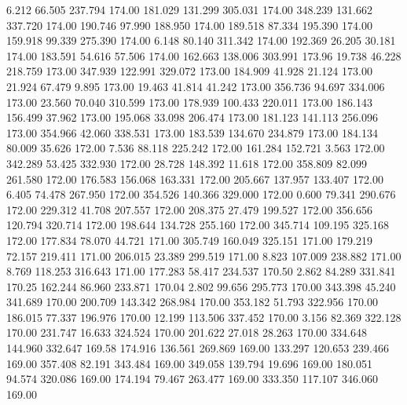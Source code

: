    6.212   66.505  237.794       174.00
 181.029  131.299  305.031       174.00
 348.239  131.662  337.720       174.00
 190.746   97.990  188.950       174.00
 189.518   87.334  195.390       174.00
 159.918   99.339  275.390       174.00
   6.148   80.140  311.342       174.00
 192.369   26.205   30.181       174.00
 183.591   54.616   57.506       174.00
 162.663  138.006  303.991       173.96
  19.738   46.228  218.759       173.00
 347.939  122.991  329.072       173.00
 184.909   41.928   21.124       173.00
  21.924   67.479    9.895       173.00
  19.463   41.814   41.242       173.00
 356.736   94.697  334.006       173.00
  23.560   70.040  310.599       173.00
 178.939  100.433  220.011       173.00
 186.143  156.499   37.962       173.00
 195.068   33.098  206.474       173.00
 181.123  141.113  256.096       173.00
 354.966   42.060  338.531       173.00
 183.539  134.670  234.879       173.00
 184.134   80.009   35.626       172.00
   7.536   88.118  225.242       172.00
 161.284  152.721    3.563       172.00
 342.289   53.425  332.930       172.00
  28.728  148.392   11.618       172.00
 358.809   82.099  261.580       172.00
 176.583  156.068  163.331       172.00
 205.667  137.957  133.407       172.00
   6.405   74.478  267.950       172.00
 354.526  140.366  329.000       172.00
   0.600   79.341  290.676       172.00
 229.312   41.708  207.557       172.00
 208.375   27.479  199.527       172.00
 356.656  120.794  320.714       172.00
 198.644  134.728  255.160       172.00
 345.714  109.195  325.168       172.00
 177.834   78.070   44.721       171.00
 305.749  160.049  325.151       171.00
 179.219   72.157  219.411       171.00
 206.015   23.389  299.519       171.00
   8.823  107.009  238.882       171.00
   8.769  118.253  316.643       171.00
 177.283   58.417  234.537       170.50
   2.862   84.289  331.841       170.25
 162.244   86.960  233.871       170.04
   2.802   99.656  295.773       170.00
 343.398   45.240  341.689       170.00
 200.709  143.342  268.984       170.00
 353.182   51.793  322.956       170.00
 186.015   77.337  196.976       170.00
  12.199  113.506  337.452       170.00
   3.156   82.369  322.128       170.00
 231.747   16.633  324.524       170.00
 201.622   27.018   28.263       170.00
 334.648  144.960  332.647       169.58
 174.916  136.561  269.869       169.00
 133.297  120.653  239.466       169.00
 357.408   82.191  343.484       169.00
 349.058  139.794   19.696       169.00
 180.051   94.574  320.086       169.00
 174.194   79.467  263.477       169.00
 333.350  117.107  346.060       169.00
